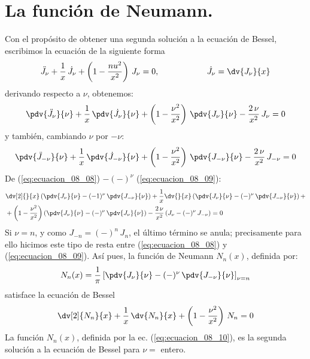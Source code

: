 \section{La función de Neumann.}
Con el propósito de obtener una segunda solución a la ecuación de Bessel, escribimos la ecuación de la siguiente forma
\[ \ddot{J}_{\nu} + \dfrac{1}{x} \, \dot{J}_{\nu} + \left( 1 - \dfrac{nu^{2}}{x^{2}} \right) \, J_{\nu} = 0, \hspace{2cm} \dot{J}_{\nu} =  \dv{J_{\nu}}{x} \]
derivando respecto a $\nu$, obtenemos:
\begin{equation}
\pdv{\ddot{J}_{\nu}}{\nu} + \dfrac{1}{x} \, \pdv{\dot{J}_{\nu}}{\nu} + \left( 1 - \dfrac{\nu^{2}}{x^{2}} \right) \, \pdv{J_{\nu}}{\nu} - \dfrac{2  \, \nu}{x^{2}} \, J_{\nu} = 0
\label{eq:ecuacion_08_08} 
\end{equation}
y también, cambiando $\nu$ por $-\nu$:
\begin{equation}
\pdv{\ddot{J}_{-\nu}}{\nu} + \dfrac{1}{x} \, \pdv{\dot{J}_{-\nu}}{\nu} + \left( 1 - \dfrac{\nu^{2}}{x^{2}} \right) \, \pdv{J_{-\nu}}{\nu} - \dfrac{2 \, \nu}{x^{2}} \, J_{-\nu} = 0
\label{eq:ecuacion_08_09} 
\end{equation}
De (\ref{eq:ecuacion_08_08}) $-(-)^{\nu}$ (\ref{eq:ecuacion_08_09}):
\begin{align*}
&\dv[2]{}{x} \left( \pdv{J_{\nu}}{\nu} - (-1)^{\nu} \, \pdv{J_{-\nu}}{\nu} \right) + \dfrac{1}{x} \dv{}{x} \left( \pdv{J_{\nu}}{\nu} - (-)^{\nu} \,\pdv{J_{-\nu}}{\nu} \right) + \\
&+ \left( 1 - \dfrac{\nu^{2}}{x^{2}} \right) \left( \pdv{J_{\nu}}{\nu} - (-)^{\nu}  \, \pdv{J_{\nu}}{\nu} \right) - \dfrac{2 \, \nu}{x^{2}} \, (J_{\nu} - (-)^{\nu} \, J_{-\nu}) = 0
\end{align*}
Si $\nu = n$, y como $J_{-n} = (-)^{n} \, J_{n}$, el último término se anula; precisamente para ello hicimos este tipo de resta entre (\ref{eq:ecuacion_08_08}) y (\ref{eq:ecuacion_08_09}). Así pues, la función de Neumann $N_{n}(x)$, definida por:
\begin{equation}
N_{n} (x) = \dfrac{1}{\pi} \left[ \pdv{J_{\nu}}{\nu} - (-)^{\nu} \, \pdv{J_{-\nu}}{\nu} \right]_{\nu = n}
\label{eq:ecuacion_08_10}
\end{equation}
satisface la ecuación de Bessel
\[ \dv[2]{N_{n}}{x} + \dfrac{1}{x} \, \dv{N_{n}}{x} + \left( 1 - \dfrac{\nu^{2}}{x^{2}} \right) \, N_{n} = 0\]
La función $N_{n}(x)$, definida por la ec. (\ref{eq:ecuacion_08_10}), es la segunda solución a la ecuación de Bessel para $\nu =$ entero.
\par
